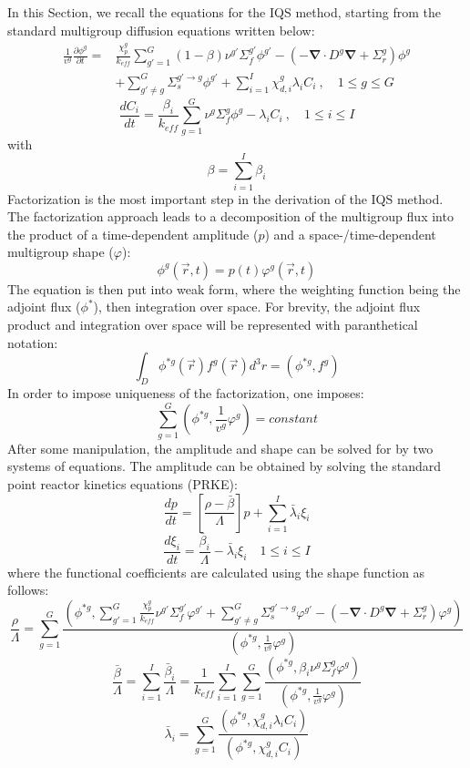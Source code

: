 \documentclass[12pt]{article}
\newcommand{\bs}[1]{\mathbf{#1}}
\renewcommand{\div}{\bs{\nabla}\! \cdot \!}
\newcommand{\grad}{\bs{\nabla}}
\newcommand{\keff}{k_\textit{eff}}
\newcommand{\be}{\begin{equation}}
\newcommand{\ee}{\end{equation}}
\begin{document}
In this Section, we recall the equations for the IQS method, starting from the standard multigroup diffusion equations written below:
\begin{align}
\frac{1}{v^g} \frac{\partial \phi^g }{\partial t} =& \frac{\chi_p^g}{\keff} \sum_{g'=1}^G (1-\beta) \nu^{g'} \Sigma_f^{g'} \phi^{g'} -  \left( -\div D^g \grad  + \Sigma_r^g \right) \phi^g  \nonumber \\
&  + \sum_{g'\neq g}^G\Sigma_s^{g'\to g} \phi^{g'}  + \sum_{i=1}^I\chi_{d,i}^g\lambda_i C_i \ , \quad 1 \le g \le G 
\end{align}
\be
\frac{dC_i}{dt} = \frac{\beta_i}{k_{eff}}\sum_{g=1}^G\nu^{g} \Sigma_f^g \phi^{g} - \lambda_i C_i \ , \quad 1 \le i \le I 
\ee
with
\be
\beta = \sum_{i=1}^I \beta_{i} 
\ee
Factorization is the most important step in the derivation of the IQS method. The factorization approach leads to a decomposition of the multigroup flux into the product of a time-dependent amplitude ($p$) and a space-/time-dependent multigroup shape ($\varphi$):
\be
\phi^g(\vec{r},t)=p(t)\varphi^g(\vec{r},t)
\ee
The equation is then put into weak form, where the weighting function being the adjoint flux ($\phi^*$), then integration over space.  For brevity, the adjoint flux product and integration over space will be represented with paranthetical notation:
\be
\int_D\phi^{*g}(\vec{r})f^g(\vec{r})d^3r=\left(\phi^{*g},f^g\right)
\ee
In order to impose uniqueness of the factorization, one imposes:
\be
\sum_{g=1}^G\left(\phi^{*g},\frac{1}{v^g}\varphi^g\right)=constant
\ee
After some manipulation, the amplitude and shape can be solved for by two systems of equations.  The amplitude can be obtained by solving the standard point reactor kinetics equations (PRKE):
\be
\frac{dp}{dt}=\left[\frac{\rho-\bar{\beta}}{\Lambda}\right]p+\sum_{i=1}^I\bar{\lambda}_i\xi_i
\ee
\be
\frac{d\xi_i}{dt}=\frac{\bar{\beta}_i}{\Lambda}-\bar{\lambda}_i\xi_i \quad 1 \le i \le I 
\ee
where the functional coefficients are calculated using the shape function as follows:
\be
\frac{\rho}{\Lambda}=\sum_{g=1}^G\frac{ \left(\phi^{*g},\sum_{g'=1}^G\frac{\chi_p^g}{k_{eff}} \nu^{g'} \Sigma_f^{g'}\varphi^{g'} + \sum_{g'\neq g}^G\Sigma_s^{g'\to g} \varphi^{g'} -\left( -\div D^g \grad  + \Sigma_r^g \right)\varphi^g\right)}{\left(\phi^{*g},\frac{1}{v^g}\varphi^g\right)}
\ee
\be
\frac{\bar{\beta}}{\Lambda}=\sum_{i=1}^I\frac{\bar{\beta}_i}{\Lambda}=\frac{1}{k_{eff}}\sum_{i=1}^I\sum_{g=1}^G\frac{(\phi^{*g}, \beta_i\nu^{g} \Sigma_f^g \varphi^{g})}{\left(\phi^{*g},\frac{1}{v^g}\varphi^g\right)}
\ee
\be
\bar{\lambda}_i=\sum_{g=1}^G\frac{(\phi^{*g},\chi_{d,i}^g\lambda_i C_i)}{(\phi^{*g},\chi_{d,i}^gC_i)}
\ee
\end{document}
